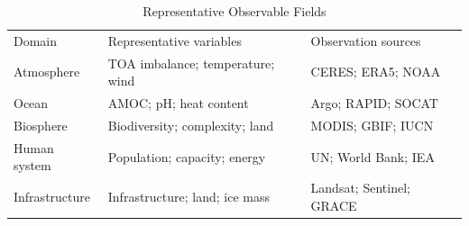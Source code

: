 \begin{table}[tb]
\caption{\label{tab:observable_fields}Representative Observable Fields}
\footnotesize
\begin{ruledtabular}
\begin{tabular}{lll}
Domain & Representative variables & Observation sources \\
Atmosphere & TOA imbalance; temperature; wind & CERES; ERA5; NOAA \\
Ocean & AMOC; pH; heat content & Argo; RAPID; SOCAT \\
Biosphere & Biodiversity; complexity; land & MODIS; GBIF; IUCN \\
Human system & Population; capacity; energy & UN; World Bank; IEA \\
Infrastructure & Infrastructure; land; ice mass & Landsat; Sentinel; GRACE \\
\end{tabular}
\end{ruledtabular}
\end{table}

